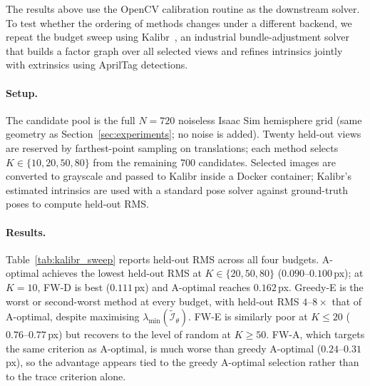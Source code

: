 \documentclass[letterpaper, 9
 pt, conference]{ieeeconf}
\begin{document}
The results above use the OpenCV calibration routine as the downstream solver.
To test whether the ordering of methods changes under a different backend, we
repeat the budget sweep using Kalibr~\citep{furgale2013kalibr}, an
industrial bundle-adjustment solver that builds a factor graph over all
selected views and refines intrinsics jointly with extrinsics using AprilTag detections.

\paragraph{Setup.}
The candidate pool is the full $N{=}720$ noiseless Isaac Sim hemisphere grid
(same geometry as Section~\ref{sec:experiments}; no noise is added).
Twenty held-out views are reserved by farthest-point sampling on translations;
each method selects $K\in\{10,20,50,80\}$ from the remaining 700 candidates.
Selected images are converted to grayscale and passed to Kalibr inside a Docker
container; Kalibr's estimated intrinsics are used with a standard pose solver
against ground-truth poses to compute held-out RMS.
\paragraph{Results.}
Table~\ref{tab:kalibr_sweep} reports held-out RMS across all four budgets.
A-optimal achieves the lowest held-out RMS at $K\in\{20,50,80\}$
($0.090$--$0.100$\,px); at $K{=}10$, FW-D is best ($0.111$\,px) and
A-optimal reaches $0.162$\,px.
Greedy-E is the worst or second-worst method at every budget, with
held-out RMS $4$--$8\times$ that of A-optimal, despite maximising
$\lambda_{\min}(\widetilde{\mathcal{I}}_\theta)$.
FW-E is similarly poor at $K\le20$ ($0.76$--$0.77$\,px) but recovers to
the level of random at $K\ge50$.
FW-A, which targets the same criterion as A-optimal, is much worse than
greedy A-optimal ($0.24$--$0.31$\,px), so the advantage appears tied to the
greedy A-optimal selection rather than to the trace criterion alone.
\end{document}
